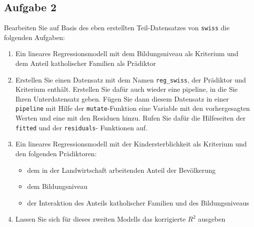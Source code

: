 \documentclass[
]{book}
\providecommand{\tightlist}{%
  \setlength{\itemsep}{0pt}\setlength{\parskip}{0pt}}
\begin{document}
\hypertarget{aufgabe-2}{%
\subsection{Aufgabe 2}\label{aufgabe-2}}

Bearbeiten Sie auf Basis des eben erstellten Teil-Datensatzes von \texttt{swiss} die folgenden Aufgaben:

\begin{enumerate}
\def\labelenumi{\arabic{enumi}.}
\item
  Ein lineares Regressionsmodell mit dem Bildungsniveau als Kriterium und dem Anteil katholischer Familien als Prädiktor
\item
  Erstellen Sie einen Datensatz mit dem Namen \texttt{reg\_swiss}, der Prädiktor und Kriterium enthält. Erstellen Sie dafür auch wieder eine pipeline, in die Sie Ihren Unterdatensatz geben. Fügen Sie dann diesem Datensatz in einer \texttt{pipeline} mit Hilfe der \texttt{mutate}-Funktion eine Variable mit den vorhergesagten Werten und eine mit den Residuen hinzu. Rufen Sie dafür die Hilfeseiten der \texttt{fitted} und der \texttt{residuals}- Funktionen auf.
\item
  Ein lineares Regressionsmodell mit der Kindersterblichkeit als Kriterium und den folgenden Prädiktoren:

  \begin{itemize}
  \tightlist
  \item
    dem in der Landwirtschaft arbeitenden Anteil der Bevölkerung
  \item
    dem Bildungsniveau
  \item
    der Interaktion des Anteils katholischer Familien und des Bildungsniveaus
  \end{itemize}
\item
  Lassen Sie sich für dieses zweiten Modells das korrigierte \(R^2\) ausgeben
\end{enumerate}
\end{document}
